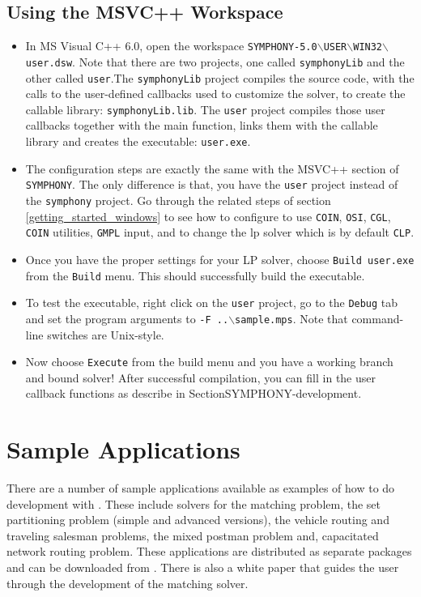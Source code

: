 \subsection{Using the MSVC++ Workspace}

\begin{itemize}
\item
In MS Visual C++ 6.0, open the workspace 
\texttt{SYMPHONY-5.0$\backslash$USER$\backslash$WIN32$\backslash$user.dsw}.
Note that there are two projects, one called \texttt{symphonyLib} and the other 
called \texttt{user}.The \texttt{symphonyLib} project compiles the source code, with the 
calls to the user-defined callbacks used to customize the solver, to create 
the callable library: \texttt{symphonyLib.lib}. The \texttt{user} 
project compiles those user callbacks together with the main function, links 
them with the callable library and creates the executable: \texttt{user.exe}.

\item 
The configuration steps are exactly the same with the MSVC++ section of 
\texttt{SYMPHONY}. The only 
difference is that, you have the \texttt{user} project instead of the
\texttt{symphony} project. Go through the related steps of section 
\ref{getting_started_windows} to see how to configure to use 
\texttt{COIN}, \texttt{OSI}, \texttt{CGL}, \texttt{COIN} utilities, 
\texttt{GMPL} input, and to change the lp solver which is by default 
\texttt{CLP}.

\item
Once you have the proper settings for your LP solver, choose \texttt{Build
user.exe} from the \texttt{Build} menu. This should successfully 
build the executable.

\item
To test the executable, right click on the \texttt{user} project, go to the
\texttt{Debug} tab and set the program arguments to 
\texttt{-F ..$\backslash$sample.mps}. Note that command-line switches are 
Unix-style.

\item
Now choose \texttt{Execute} from the build menu and you have a working branch
and bound solver! After successful compilation, you can fill in the user
callback functions as describe in Section{SYMPHONY-development}.
\end{itemize}

\section{Sample Applications}

There are a number of sample applications available as examples of how to do
development with \BB. These include solvers for the matching problem, the set
partitioning problem (simple and advanced versions), the vehicle routing and
traveling salesman problems, the mixed postman problem and, capacitated
network routing problem. These applications are distributed as separate
packages and can be downloaded from
\texttt{}. There is also a white paper that guides the
user through the development of the matching solver.
